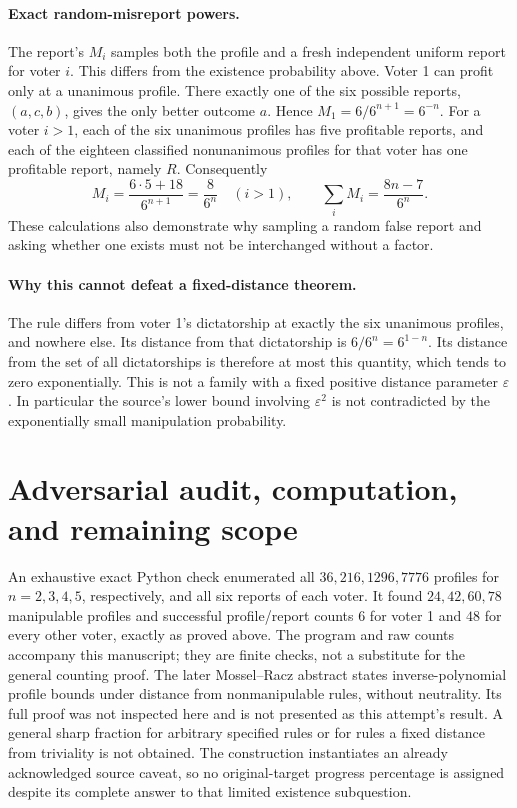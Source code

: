 \documentclass[11pt]{article}
\begin{document}
\paragraph{Exact random-misreport powers.}
The report's $M_i$ samples both the profile and a fresh independent uniform
report for voter $i$. This differs from the existence probability above.
Voter 1 can profit only at a unanimous profile. There exactly one of the
six possible reports, $(a,c,b)$, gives the only better outcome $a$.
Hence $M_1=6/6^{n+1}=6^{-n}$. For a voter $i>1$, each of the six
unanimous profiles has five profitable reports, and each of the eighteen
classified nonunanimous profiles for that voter has one profitable report,
namely $R$. Consequently
\[
M_i=\frac{6\cdot5+18}{6^{n+1}}=\frac8{6^n}\quad(i>1),
\qquad \sum_iM_i=\frac{8n-7}{6^n}.
\]
These calculations also demonstrate why sampling a random false report and
asking whether one exists must not be interchanged without a factor.

\paragraph{Why this cannot defeat a fixed-distance theorem.}
The rule differs from voter 1's dictatorship at exactly the six unanimous
profiles, and nowhere else. Its distance from that dictatorship is
$6/6^n=6^{1-n}$. Its distance from the set of all dictatorships is therefore
at most this quantity, which tends to zero exponentially. This is not a
family with a fixed positive distance parameter $\varepsilon$.
In particular the source's lower bound involving $\varepsilon^2$ is not
contradicted by the exponentially small manipulation probability.

\section{Adversarial audit, computation, and remaining scope}
An exhaustive exact Python check enumerated all $36,216,1296,7776$ profiles
for $n=2,3,4,5$, respectively, and all six reports of each voter. It found
$24,42,60,78$ manipulable profiles and successful profile/report counts
$6$ for voter 1 and $48$ for every other voter, exactly as proved above.
The program and raw counts accompany this manuscript; they are finite checks,
not a substitute for the general counting proof.
The later Mossel--Racz abstract states inverse-polynomial profile bounds
under distance from nonmanipulable rules, without neutrality. Its full proof
was not inspected here and is not presented as this attempt's result.
A general sharp fraction for arbitrary specified rules or for rules a fixed
distance from triviality is not obtained. The construction instantiates an
already acknowledged source caveat, so no original-target progress percentage
is assigned despite its complete answer to that limited existence subquestion.
\end{document}

